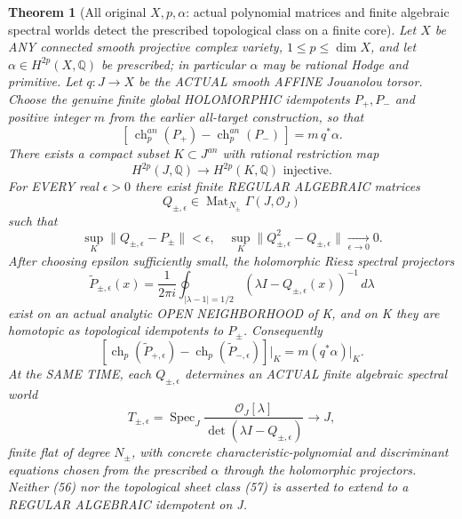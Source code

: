 \documentclass[11pt]{article}
\newtheorem{theorem}{Theorem}[section]
\begin{document}
\begin{theorem}[All original $X,p,\alpha$: actual polynomial matrices and finite algebraic spectral worlds detect the prescribed topological class on a finite core]
Let $X$ be ANY connected smooth projective complex variety,
$1\le p\le\dim X$,
and let $\alpha\in H^{2p}(X,\mathbb Q)$ be prescribed;
in particular $\alpha$ may be rational Hodge and
primitive. Let $q:J\to X$ be the ACTUAL smooth AFFINE
Jouanolou torsor.
Choose the genuine finite global HOLOMORPHIC idempotents
$P_+,P_-$ and positive integer $m$ from the earlier
all-target construction, so that
\[
 [\,\operatorname{ch}^{an}_p(P_+)
 -\operatorname{ch}^{an}_p(P_-)\,]
       =m\,q^*\alpha .
\]
There exists a compact subset $K\subset J^{an}$
with rational restriction map
\[
 \boxed{H^{2p}(J,\mathbb Q)\longrightarrow
                H^{2p}(K,\mathbb Q)
                \text{ injective}.}                  \tag{54}
\]
For EVERY real $\epsilon>0$ there exist finite
REGULAR ALGEBRAIC matrices
\[
 Q_{\pm,\epsilon}\in
  \operatorname{Mat}_{N_\pm}\Gamma(J,\mathcal O_J)
\]
such that
\[
 \boxed{
 \sup_K\|Q_{\pm,\epsilon}-P_\pm\|<\epsilon,
 \quad
 \sup_K\|Q_{\pm,\epsilon}^2
              -Q_{\pm,\epsilon}\|\xrightarrow[\epsilon\to0]{}0.
 }                                                   \tag{55}
\]
After choosing epsilon sufficiently small,
the holomorphic Riesz spectral projectors
\[
 \widetilde P_{\pm,\epsilon}(x)=
   \frac{1}{2\pi i}\oint_{|\lambda-1|=1/2}
       (\lambda I-Q_{\pm,\epsilon}(x))^{-1}\,d\lambda
                                                              \tag{56}
\]
exist on an actual analytic OPEN NEIGHBORHOOD
of K, and on K they are homotopic as
topological idempotents to $P_\pm$.
Consequently
\[
 \boxed{
 \left[
   \operatorname{ch}_p(\widetilde P_{+,\epsilon})
  -\operatorname{ch}_p(\widetilde P_{-,\epsilon})
 \right]\Big|_K
        =m(q^*\alpha)|_K.}                           \tag{57}
\]
At the SAME TIME, each $Q_{\pm,\epsilon}$ determines
an ACTUAL finite algebraic spectral world
\[
 \boxed{
 T_{\pm,\epsilon}
 =\operatorname{Spec}_J
  \frac{\mathcal O_J[\lambda]}
       {\det(\lambda I-Q_{\pm,\epsilon})}
       \longrightarrow J ,}                         \tag{58}
\]
finite flat of degree $N_\pm$, with concrete
characteristic-polynomial and discriminant
equations chosen from the prescribed
$\alpha$ through the holomorphic projectors.
Neither (56) nor the topological sheet class
(57) is asserted to extend to a REGULAR
ALGEBRAIC idempotent on J.
\end{theorem}
\end{document}
